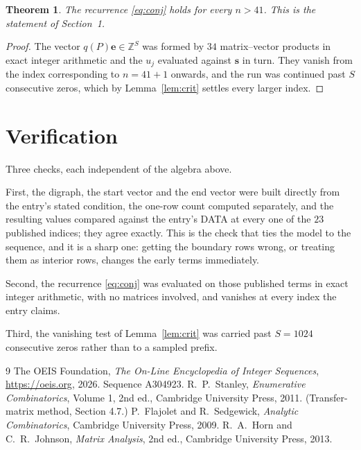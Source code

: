 \documentclass[11pt,a4paper]{article}
\theoremstyle{plain}
\newtheorem{theorem}{Theorem}
\theoremstyle{definition}
\begin{document}
\begin{theorem}
The recurrence \eqref{eq:conj} holds for every $n>41$. This is the statement of
Section~1.
\end{theorem}

\begin{proof}
The vector $q(P)\mathbf{e}\in\mathbb{Z}^{S}$ was formed by $34$ matrix--vector
products in exact integer arithmetic and the $u_j$ evaluated against $\mathbf{s}$ in turn.
They vanish from the index corresponding to $n=41+1$ onwards, and the run was continued
past $S$ consecutive zeros, which by Lemma~\ref{lem:crit} settles every larger index.
\end{proof}

\section{Verification}

Three checks, each independent of the algebra above.

First, the digraph, the start vector and the end vector were built directly from the
entry's stated condition, the one-row count computed separately, and the resulting values
compared against the entry's DATA at every one of the $23$ published indices; they
agree exactly. This is the check that ties the model to the sequence, and it is a sharp one:
getting the boundary rows wrong, or treating them as interior rows, changes the early terms
immediately.

Second, the recurrence \eqref{eq:conj} was evaluated on those published terms in exact
integer arithmetic, with no matrices involved, and vanishes at every index the entry claims.

Third, the vanishing test of Lemma~\ref{lem:crit} was carried past $S=1024$ consecutive
zeros rather than to a sampled prefix.

\begin{thebibliography}{9}
 The OEIS Foundation, \emph{The On-Line Encyclopedia of Integer
Sequences}, \url{https://oeis.org}, 2026. Sequence A304923.
 R.~P.~Stanley, \emph{Enumerative Combinatorics}, Volume 1, 2nd ed.,
Cambridge University Press, 2011. (Transfer-matrix method, Section 4.7.)
 P.~Flajolet and R.~Sedgewick, \emph{Analytic Combinatorics}, Cambridge
University Press, 2009.
 R.~A.~Horn and C.~R.~Johnson, \emph{Matrix Analysis}, 2nd ed., Cambridge
University Press, 2013.
\end{thebibliography}
\end{document}

